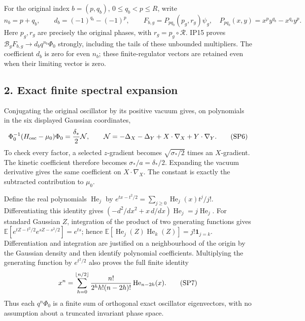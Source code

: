 \documentclass[11pt]{article}
\begin{document}
For the original index \(b=(p,q_b)\), \(0\le q_b<p\le R\), write
\[
 n_b=p+q_b,\qquad d_b=(-1)^{q_b}-(-1)^p,\qquad
 F_{b,g}=P_{p q_b}(p_g,r_g)\psi_g,
 \quad P_{p q_b}(x,y)=x^py^{q_b}-x^{q_b}y^p.
 \tag{SP5}
\]
Here \(p_g,r_g\) are precisely the original phases, with \(r_g=p_g\circ\mathcal R\). IP15 proves \(\mathcal B_gF_{b,g}\to d_bq^{n_b}\Phi_0\) strongly, including the tails of these unbounded multipliers. The coefficient \(d_b\) is zero for even \(n_b\); these finite-regulator vectors are retained even when their limiting vector is zero.

\subsection*{2. Exact finite spectral expansion}

Conjugating the original oscillator by its positive vacuum gives, on polynomials in the six displayed Gaussian coordinates,
\[
 \Phi_0^{-1}(H_{\rm osc}-\mu_0)\Phi_0
 ={\delta_*\over2}\mathcal N,\qquad
 \mathcal N=-\Delta_X-\Delta_Y+X\cdot\nabla_X+Y\cdot\nabla_Y.
 \tag{SP6}
\]
To check every factor, a selected \(z\)-gradient becomes \(\sqrt{\sigma_*/2}\) times an \(X\)-gradient. The kinetic coefficient therefore becomes \(\sigma_*/a=\delta_*/2\). Expanding the vacuum derivative gives the same coefficient on \(X\cdot\nabla_X\). The constant is exactly the subtracted contribution to \(\mu_0\).

Define the real polynomials \(\operatorname{He}_j\) by
\(e^{tx-t^2/2}=\sum_{j\ge0}\operatorname{He}_j(x)t^j/j!\).
Differentiating this identity gives
\(( -d^2/dx^2+x\,d/dx)\operatorname{He}_j=j\operatorname{He}_j\).
For standard Gaussian \(Z\), integration of the product of two generating functions gives \(\mathbb E[e^{tZ-t^2/2}e^{sZ-s^2/2}]=e^{ts}\); hence
\(\mathbb E[\operatorname{He}_j(Z)\operatorname{He}_k(Z)]=j!\mathbf1_{j=k}\).
Differentiation and integration are justified on a neighbourhood of the origin by the Gaussian density and then identify polynomial coefficients. Multiplying the generating function by \(e^{t^2/2}\) also proves the full finite identity
\[
 x^n=\sum_{h=0}^{\lfloor n/2\rfloor}
 {n!\over2^h h!(n-2h)!}\operatorname{He}_{n-2h}(x).
 \tag{SP7}
\]
Thus each \(q^n\Phi_0\) is a finite sum of orthogonal exact oscillator eigenvectors, with no assumption about a truncated invariant phase space.
\end{document}
